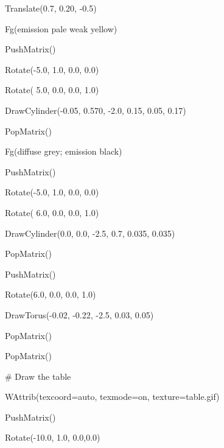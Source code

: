 \documentclass[letterpaper]{article}
\begin{document}
{{\sffamily
\ \ \ Translate(0.7, 0.20, -0.5)}

{\sffamily
\ \ \ Fg({\textquotedbl}emission pale weak yellow{\textquotedbl})}

{\sffamily
\ \ \ PushMatrix()}

{\sffamily
\ \ \ Rotate(-5.0, 1.0, 0.0, 0.0)}

{\sffamily
\ \ \ Rotate( 5.0, 0.0, 0.0, 1.0)}

{\sffamily
\ \ \ DrawCylinder(-0.05, 0.570, -2.0, 0.15, 0.05, 0.17)}

{\sffamily
\ \ \ PopMatrix()}

{\sffamily
\ \ \ Fg({\textquotedbl}diffuse grey; emission black{\textquotedbl})}

{\sffamily
\ \ \ PushMatrix()}

{\sffamily
\ \ \ Rotate(-5.0, 1.0, 0.0, 0.0)}

{\sffamily
\ \ \ Rotate( 6.0, 0.0, 0.0, 1.0)}

{\sffamily
\ \ \ DrawCylinder(0.0, 0.0, -2.5, 0.7, 0.035, 0.035)}

{\sffamily
\ \ \ PopMatrix()}

{\sffamily
\ \ \ PushMatrix()}

{\sffamily
\ \ \ Rotate(6.0, 0.0, 0.0, 1.0)}

{\sffamily
\ \ \ DrawTorus(-0.02, -0.22, -2.5, 0.03, 0.05)}

{\sffamily
\ \ \ PopMatrix() }

{\sffamily
\ \ \ PopMatrix()}


\bigskip

{\sffamily
\ \ \ \# Draw the table }

{\sffamily
\ \ \ WAttrib({\textquotedbl}texcoord=auto{\textquotedbl}, {\textquotedbl}texmode=on{\textquotedbl},
{\textquotedbl}texture=table.gif{\textquotedbl})}


\bigskip

{\sffamily
\ \ \ PushMatrix()}

{\sffamily
\ \ \ Rotate(-10.0, 1.0, 0.0,0.0)}

}
\end{document}
